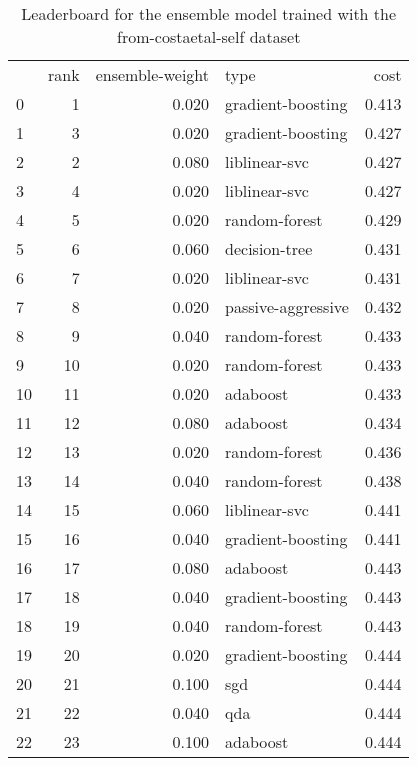\begin{table}[]
	\centering
	\begin{tabular}{lrrlr}
		   & rank & ensemble-weight & type               & cost  \\
		0  & 1    & 0.020           & gradient-boosting  & 0.413 \\
		1  & 3    & 0.020           & gradient-boosting  & 0.427 \\
		2  & 2    & 0.080           & liblinear-svc      & 0.427 \\
		3  & 4    & 0.020           & liblinear-svc      & 0.427 \\
		4  & 5    & 0.020           & random-forest      & 0.429 \\
		5  & 6    & 0.060           & decision-tree      & 0.431 \\
		6  & 7    & 0.020           & liblinear-svc      & 0.431 \\
		7  & 8    & 0.020           & passive-aggressive & 0.432 \\
		8  & 9    & 0.040           & random-forest      & 0.433 \\
		9  & 10   & 0.020           & random-forest      & 0.433 \\
		10 & 11   & 0.020           & adaboost           & 0.433 \\
		11 & 12   & 0.080           & adaboost           & 0.434 \\
		12 & 13   & 0.020           & random-forest      & 0.436 \\
		13 & 14   & 0.040           & random-forest      & 0.438 \\
		14 & 15   & 0.060           & liblinear-svc      & 0.441 \\
		15 & 16   & 0.040           & gradient-boosting  & 0.441 \\
		16 & 17   & 0.080           & adaboost           & 0.443 \\
		17 & 18   & 0.040           & gradient-boosting  & 0.443 \\
		18 & 19   & 0.040           & random-forest      & 0.443 \\
		19 & 20   & 0.020           & gradient-boosting  & 0.444 \\
		20 & 21   & 0.100           & sgd                & 0.444 \\
		21 & 22   & 0.040           & qda                & 0.444 \\
		22 & 23   & 0.100           & adaboost           & 0.444 \\
	\end{tabular}

	\caption{Leaderboard for the ensemble model trained with the from-costaetal-self dataset}
	\label{tab:lb-from-costaetal-self-randsplit}
\end{table}

